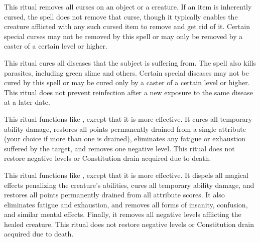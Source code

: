 \spelleffect This ritual removes all curses on an object or a creature. If an item is inherently cursed, the spell does not remove that curse, though it typically enables the creature afflicted with any such cursed item to remove and get rid of it. Certain special curses may not be removed by this spell or may only be removed by a caster of a certain level or higher.

\spelleffect This ritual cures all diseases that the subject is suffering from. The spell also kills parasites, including green slime and others. Certain special diseases may not be cured by this spell or may be cured only by a caster of a certain level or higher.
\spellnotes This ritual does not prevent reinfection after a new exposure to the same disease at a later date.

\spelleffect This ritual functions like , except that it is more effective. It cures all temporary ability damage, restores all points permanently drained from a single attribute (your choice if more than one is drained), eliminates any fatigue or exhaustion suffered by the target, and removes one negative level.
\spellnotes This ritual does not restore negative levels or Constitution drain acquired due to death.

\spelleffect This ritual functions like , except that it is more effective. It dispels all magical effects penalizing the creature's abilities, cures all temporary ability damage, and restores all points permanently drained from all attribute scores. It also eliminates fatigue and exhaustion, and removes all forms of insanity, confusion, and similar mental effects. Finally, it removes all negative levels afflicting the healed creature. 
\spellnotes This ritual does not restore negative levels or Constitution drain acquired due to death.


